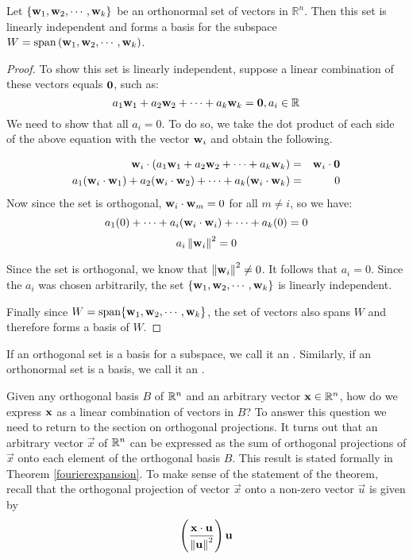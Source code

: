 \documentclass{ximera}
\begin{document}
\begin{theorem}\label{orthbasis}
Let $ \{ {\bf w}_1, {\bf w}_2, \cdots, {\bf w}_k \}$ be an
orthonormal set of vectors in $\mathbb{R}^n$. Then this set is
linearly independent and forms a basis for the subspace $W =
\mbox{span}\left( {\bf w}_1, {\bf w}_2, \cdots, {\bf w}_k \right)$.
\end{theorem}

\begin{proof}
To show this set is linearly independent, suppose a linear combination
of these vectors equals ${\bf 0}$, such as:
\[
a_1 {\bf w}_1 + a_2 {\bf w}_2 + \cdots + a_k {\bf w}_k = {\bf 0}, a_i \in \mathbb{R}
\]
We need to show that all $a_i = 0$. To do so, we take the dot product of
each side of the above equation with the vector ${\bf w}_i$ and obtain the following.

\begin{eqnarray*}
{\bf w}_i \cdot (a_1 {\bf w}_1 + a_2 {\bf w}_2 + \cdots + a_k {\bf w}_k ) &=& {\bf w}_i \cdot {\bf 0}\\
a_1 ({\bf w}_i \cdot {\bf w}_1) + a_2 ({\bf w}_i \cdot {\bf w}_2) + \cdots + a_k ({\bf w}_i \cdot {\bf w}_k)  &=& 0
\end{eqnarray*}
Now since the set is orthogonal, ${\bf w}_i \cdot {\bf w}_m = 0$ for all $m \neq i$, so we have:
\[
a_1 (0) + \cdots + a_i({\bf w}_i \cdot {\bf w}_i) + \cdots + a_k (0) = 0
\]
\[
a_i \left\lVert{\bf w}_i\right\rVert^2 = 0
\]

Since the set is orthogonal, we know that $\left\lVert{\bf w}_i\right\rVert^2  \neq 0$. It follows that $a_i =0$. Since the $a_i$ was chosen arbitrarily, the set $\{ {\bf w}_1, {\bf w}_2, \cdots, {\bf w}_k \}$ is linearly independent.

Finally since $W = \mbox{span} \{ {\bf w}_1, {\bf w}_2, \cdots,
{\bf w}_k \}$, the set of vectors also spans $W$ and therefore forms a basis of $W$.

\end{proof}

If an orthogonal set is a basis for a subspace, we call it an
. Similarly, if an orthonormal set is a basis, we call it an .

Given any orthogonal basis $B$ of $\mathbb{R}^n$ and an arbitrary vector ${\bf x} \in \mathbb{R}^n$, how do we express ${\bf x}$ as a linear combination of vectors in $B$? To answer this question we need to return to the section on orthogonal projections. It turns out that an arbitrary vector $\vec{x}$ of $\mathbb{R}^n$ can be expressed as the sum of orthogonal projections of $\vec{x}$ onto each element of the orthogonal basis $B$. This result is stated formally in Theorem \ref{fourierexpansion}.
To make sense of the statement of the theorem, recall that the orthogonal projection of vector $\vec{x}$ onto a non-zero vector $\vec{u}$ is given by
$$\left(\frac{\mathbf{x}\cdot\mathbf{u}}{\left\lVert\mathbf{u}\right\rVert^2}\right)\mathbf{u}$$
\end{document}

